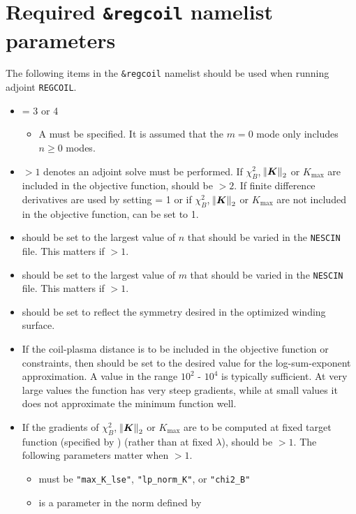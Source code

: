 \section{Required \texttt{\&regcoil} namelist parameters}
The following items in the \texttt{\&regcoil} namelist should be used when running adjoint \texttt{REGCOIL}. 
\begin{itemize}
\item {} = 3 or 4 
    \begin{itemize}
    \item A  must be specified. It is assumed that the $m=0$ mode only includes $n\geq0$ modes. 
    \end{itemize}
\item {} $>1$ denotes an adjoint solve must be performed. If $\chi^2_B$, $\norm{\bm{K}}_2$ or $K_{\text{max}}$ are included in the objective function,  should be $>2$. If finite difference derivatives are used by setting  = 1 or if $\chi^2_B$, $\norm{\bm{K}}_2$ or $K_{\text{max}}$ are not included in the objective function,  can be set to 1. 
\item {} should be set to the largest value of $n$ that should be varied in the \texttt{NESCIN} file. This matters if  $>1$.
\item {} should be set to the largest value of $m$ that should be varied in the \texttt{NESCIN} file. This matters if  $>1$.
\item {} should be set to reflect the symmetry desired in the optimized winding surface. 
\item If the coil-plasma distance is to be included in the objective function or constraints, then  should be set to the desired value for the log-sum-exponent approximation. A value in the range $10^{2}$ - $10^4$ is typically sufficient. At very large values the function has very steep gradients, while at small values it does not approximate the minimum function well. 
\item If the gradients of $\chi^2_B$, $\norm{\bm{K}}_2$ or $K_{\text{max}}$  are to be computed at fixed target function (specified by ) (rather than at fixed $\lambda$),  should be $>1$. The following parameters matter when  $>1$. 
	\begin{itemize}
	\item {} must be \texttt{"max\_K\_lse"}, \texttt{"lp\_norm\_K"}, or \texttt{"chi2\_B"}
	\item {} is a parameter in the norm defined by 
	\end{itemize}
\end{itemize}

